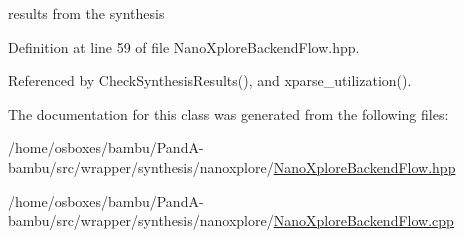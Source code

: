 results from the synthesis 



Definition at line 59 of file Nano\+Xplore\+Backend\+Flow.\+hpp.



Referenced by Check\+Synthesis\+Results(), and xparse\+\_\+utilization().



The documentation for this class was generated from the following files\+:\begin{DoxyCompactItemize}
\item 
/home/osboxes/bambu/\+Pand\+A-\/bambu/src/wrapper/synthesis/nanoxplore/\hyperlink{NanoXploreBackendFlow_8hpp}{Nano\+Xplore\+Backend\+Flow.\+hpp}\item 
/home/osboxes/bambu/\+Pand\+A-\/bambu/src/wrapper/synthesis/nanoxplore/\hyperlink{NanoXploreBackendFlow_8cpp}{Nano\+Xplore\+Backend\+Flow.\+cpp}\end{DoxyCompactItemize}
